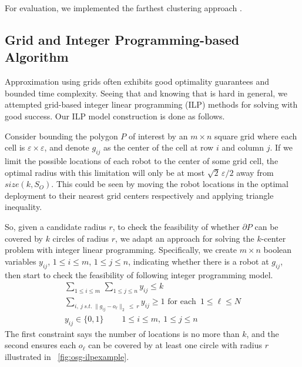 For evaluation, we implemented the farthest clustering approach 
\cite{gonzalez1985clustering}.

\subsection{Grid and Integer Programming-based Algorithm}
Approximation using grids \cite{har2011geometric} often exhibits good 
optimality guarantees and bounded time complexity. Seeing that and knowing
that \osgt is hard in general, we attempted grid-based integer linear programming 
(ILP) methods for solving \osgt with good success. Our ILP model 
construction is done as follows. 


Consider bounding the polygon $P$ of interest by an $m\times n$ square grid 
where each cell is $\varepsilon \times \varepsilon$, and denote $g_{ij}$ as the center 
of the cell at row $i$ and column $j$. If we limit the possible locations of 
each robot to the center of some grid cell, the optimal radius with this 
limitation will only be at most $\sqrt{2}\,\varepsilon / 2$ away from 
$size(k, S_O)$. This could be seen by moving the robot locations in the optimal deployment
to their nearest grid centers respectively and applying triangle inequality.

So, given a candidate radius $r$, to check the feasibility of whether 
$\partial P$ can be covered by $k$ circles of radius $r$, we adapt an 
approach for solving the $k$-center problem\cite{daskin2000new} with 
integer linear programming. Specifically, we create $m\times n$ boolean 
variables $y_{ij}$, $1\leq i\leq m$, $1\leq j \leq n$, indicating whether 
there is a robot at $g_{ij}$, then start to check the feasibility of 
following integer programming model.
\begin{align}
    \sum_{ 1\leq i\leq m }\,\sum_{1\leq j \leq n} y_{ij} \leq k\qquad \qquad \qquad \\
    \sum_{i,\ j\ s.t.\ \lVert g_{ij} - o_\ell\rVert_2\ \leq\ r} y_{ij} \geq 1 \text{ for each }\, 1\leq \ell \leq N\\
    y_{ij} \in \{0,1\}\ \qquad 1\leq i\leq m,\ 1\leq j \leq n
\end{align}
The first constraint says the number of locations is no more than $k$, and 
the second ensures each $o_\ell$ can be covered by at least one circle 
with radius $r$ illustrated in ~\ref{fig:osg-ilpexample}.


